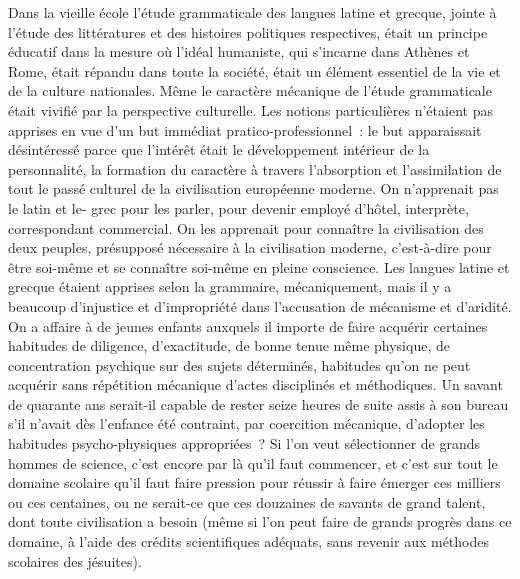 \documentclass[french,twoside]{book} %
\begin{document}
Dans la vieille école l’étude grammaticale des langues latine et grecque, jointe à l’étude des littératures et des histoires politiques respectives, était un principe éducatif dans la mesure où l’idéal humaniste, qui s’incarne dans Athènes et Rome, était répandu dans toute la société, était un élément essentiel de la vie et de la culture nationales. Même le caractère mécanique de l’étude grammaticale était vivifié par la perspective culturelle. Les notions particulières n’étaient pas apprises en vue d’un but immédiat pratico-professionnel : le but apparaissait désintéressé parce que l’intérêt était le développement intérieur de la personnalité, la formation du caractère à travers l’absorption et l’assimilation de tout le passé culturel de la civilisation européenne moderne. On n’apprenait pas le latin et le- grec pour les parler, pour devenir employé d’hôtel, interprète, correspondant commercial. On les apprenait pour connaître la civilisation des deux peuples, présupposé nécessaire à la civilisation moderne, c’est-à-dire pour être soi-même et se connaître soi-même en pleine conscience. Les langues latine et grecque étaient apprises selon la grammaire, mécaniquement, mais il y a beaucoup d’injustice et d’impropriété dans l’accusation de mécanisme et d’aridité. On a affaire à de jeunes enfants auxquels il importe de faire acquérir certaines habitudes de diligence, d’exactitude, de bonne tenue même physique, de concentration psychique sur des sujets déterminés, habitudes qu’on ne peut acquérir sans répétition mécanique d’actes disciplinés et méthodiques. Un savant de quarante ans serait-il capable de rester seize heures de suite assis à son bureau s’il n’avait dès l’enfance été contraint, par coercition mécanique, d’adopter les habitudes psycho-physiques appropriées ? Si l’on veut sélectionner de grands hommes de science, c’est encore par là qu’il faut commencer, et c’est sur tout le domaine scolaire qu’il faut faire pression pour réussir à faire émerger ces milliers ou ces centaines, ou ne serait-ce que ces douzaines de savants de grand talent, dont toute civilisation a besoin (même si l’on peut faire de grands progrès dans ce domaine, à l’aide des crédits scientifiques adéquats, sans revenir aux méthodes scolaires des jésuites).\par
\end{document}
